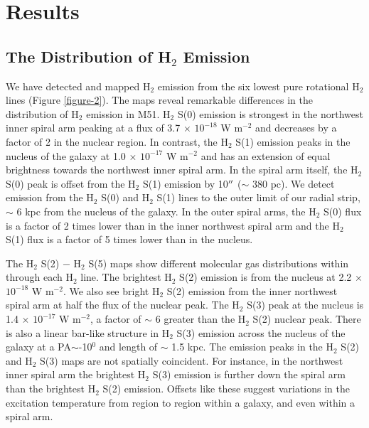 \documentclass[manuscript]{aastex}
\begin{document}
\section{Results}

\subsection{The Distribution of H$_2$ Emission}

We have detected and mapped H$_2$ emission from the six
lowest pure rotational H$_2$ lines (Figure \ref{figure-2}).  The
maps reveal remarkable differences in the distribution of
H$_2$ emission in M51.  H$_2$ S(0) emission is
strongest in the northwest inner spiral arm peaking at a flux of 3.7
$\times$ $\mathrm{10^{-18}}$ W $\mathrm{m^{-2}}$ and decreases by a
factor of 2 in the nuclear region.  In contrast, the H$_2$
S(1) emission peaks in the nucleus of the galaxy at
1.0 $\times$ $\mathrm{10^{-17}}$ W $\mathrm{m^{-2}}$ and has an
extension of equal brightness towards the northwest inner spiral arm.  In the
spiral arm itself, the H$_2$ S(0) peak is offset from the
H$_2$ S(1) emission by 10$\mbox{$^{\prime\prime}$}$ ($\sim$ 380 pc).  
We detect emission from the H$_2$ S(0) and 
H$_2$ S(1) lines to the outer limit of our radial 
strip,  $\sim$ 6 kpc from the nucleus of the galaxy.  In the outer spiral arms,
the H$_2$ S(0) flux is a factor of 2 times lower than in
the inner northwest spiral arm and the H$_2$ S(1) flux
is a factor of 5 times lower than in the nucleus.
 
The $\mathrm{ H_2}$ S(2) $-$ H$_2$ S(5) maps show different
molecular gas distributions within  through each
H$_2$ line.  The brightest H$_2$ S(2) emission is
from the nucleus at 2.2 $\times$ $\mathrm{10^{-18}}$ W
$\mathrm{m^{-2}}$.  We also see bright H$_2$ S(2) emission
from the inner northwest spiral arm at half the flux of the
nuclear peak.  The H$_2$ S(3) peak at the nucleus is 1.4
$\times$ $\mathrm{10^{-17}}$ W $\mathrm{m^{-2}}$, a factor of $\sim$ 6
greater than the H$_2$ S(2) nuclear peak.  There is also a
linear bar-like structure in H$_2$ S(3) emission across the
nucleus of the galaxy at a PA$\sim$-10$^0$ and length of $\sim$ 1.5 kpc. 
The emission peaks in the
H$_2$ S(2) and H$_2$ S(3) maps are not spatially
coincident.  For instance, in the northwest inner spiral arm the brightest
H$_2$ S(3) emission is further down the spiral arm than 
the brightest H$_2$ S(2) emission.  Offsets like
these suggest variations in the excitation temperature from 
region to region within a galaxy, and even within a spiral arm.
\end{document}
